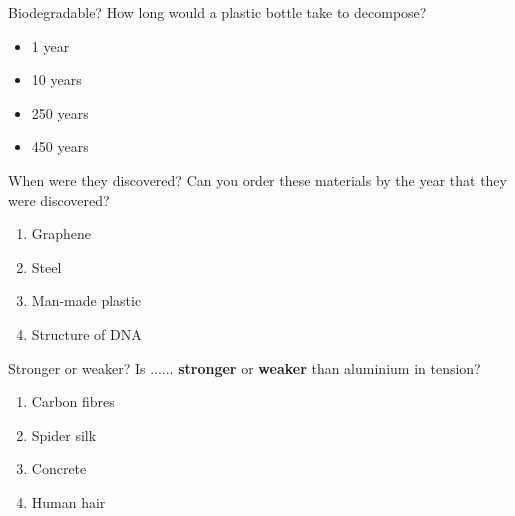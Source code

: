 \documentclass[a4paper, 12pt]{article}
\begin{document}
	\begin{question}[colback=black!10]{Biodegradable?}
  		How long would a plastic bottle take to decompose?
  		\begin{itemize}
  		\centering
  			\item 1 year
  			\item 10 years
  			\item 250 years
  			\item 450 years
  		\end{itemize}
	\end{question}
	\newpage
	\begin{question}[colback=yellow!10]{When were they discovered?}
		Can you order these materials by the year that they were discovered?
		\begin{enumerate}
  		\centering
  			\item Graphene %
  			\item Steel %
  			\item Man-made plastic %
  			\item Structure of DNA %
  		\end{enumerate}
	\end{question}
	\begin{question}[colback=blue!10]{Stronger or weaker?}
  		Is ...... \textbf{stronger} or \textbf{weaker} than aluminium in tension?
  		\begin{enumerate}
  		\centering
  			\item Carbon fibres
  			\item Spider silk
  			\item Concrete
  			\item Human hair
  		\end{enumerate}
	\end{question}
\end{document}
